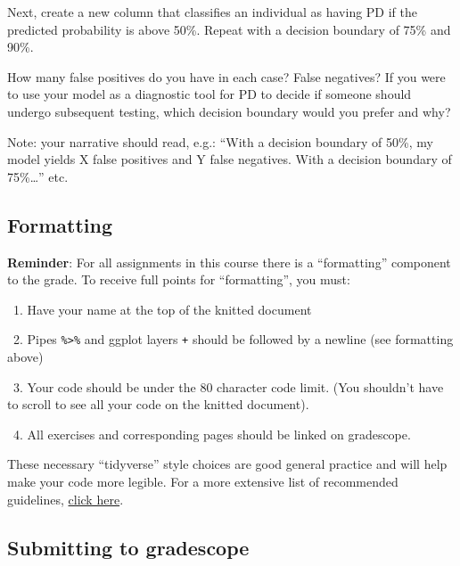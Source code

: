 \documentclass[
]{article}
\newenvironment{Shaded}{\begin{snugshade}}{\end{snugshade}}
\newcommand{\CommentTok}[1]{\textcolor[rgb]{0.56,0.35,0.01}{\textit{#1}}}
\begin{document}
\begin{Shaded}
\end{Shaded}

Next, create a new column that classifies an individual as having PD if
the predicted probability is above 50\%. Repeat with a decision boundary
of 75\% and 90\%.

How many false positives do you have in each case? False negatives? If
you were to use your model as a diagnostic tool for PD to decide if
someone should undergo subsequent testing, which decision boundary would
you prefer and why?

Note: your narrative should read, e.g.: ``With a decision boundary of
50\%, my model yields X false positives and Y false negatives. With a
decision boundary of 75\%\ldots{}'' etc.

\hypertarget{formatting}{%
\subsection{Formatting}\label{formatting}}

\textbf{Reminder}: For all assignments in this course there is a
``formatting'' component to the grade. To receive full points for
``formatting'', you must:

~1. Have your name at the top of the knitted document

~2. Pipes \texttt{\%\textgreater{}\%} and ggplot layers \texttt{+}
should be followed by a newline (see formatting above)

~3. Your code should be under the 80 character code limit. (You
shouldn't have to scroll to see all your code on the knitted document).

~4. All exercises and corresponding pages should be linked on
gradescope.

These necessary ``tidyverse'' style choices are good general practice
and will help make your code more legible. For a more extensive list of
recommended guidelines, \href{https://style.tidyverse.org/}{click here}.

\hypertarget{submitting-to-gradescope}{%
\subsection{Submitting to gradescope}\label{submitting-to-gradescope}}
\end{document}
